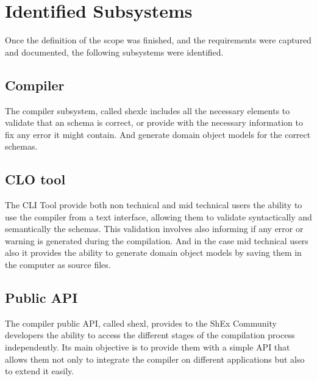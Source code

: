 \section{Identified Subsystems}

Once the definition of the scope was finished, and the requirements were captured and documented, the following subsystems were identified.

\subsection{Compiler}
The compiler subsystem, called shexlc includes all the necessary elements to validate that
an schema is correct, or provide with the necessary information to fix any error it might
contain. And generate domain object models for the correct schemas. 

\subsection{CLO tool}
The CLI Tool provide both non technical and mid technical users the ability to use the
compiler from a text interface, allowing them to validate syntactically and semantically the
schemas. This validation involves also informing if any error or warning is generated during
the compilation. And in the case mid technical users also it provides the ability to generate
domain object models by saving them in the computer as source files. 

\subsection{Public API}
The compiler public API, called shexl, provides to the ShEx Community developers the
ability to access the different stages of the compilation process independently. Its main
objective is to provide them with a simple API that allows them not only to integrate the
compiler on different applications but also to extend it easily. 